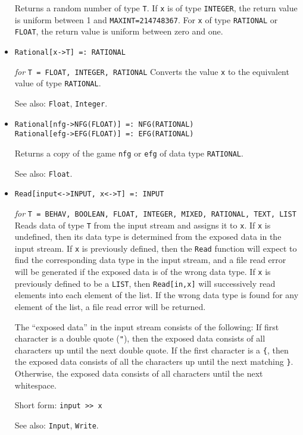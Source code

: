 \begin{itemize}
\bd
Returns a random number of type \verb+T+.  If \verb+x+ is of type
\verb+INTEGER+, the return value is uniform between 1 and
\verb+MAXINT=214748367+.  For \verb+x+ of type \verb+RATIONAL+ or
\verb+FLOAT+, the return value is uniform between zero and one.  
\ed

\item
\protect \large \begin{verbatim}
Rational[x->T] =: RATIONAL
\end{verbatim} \normalsize

{\it for} {\tt T = FLOAT, INTEGER, RATIONAL}
\bd
Converts the value \verb+x+ to the equivalent value of
type {\tt RATIONAL}.
\item [See also:] \verb+Float+, \verb+Integer+.
\ed

\item
\protect \large \begin{verbatim}
Rational[nfg->NFG(FLOAT)] =: NFG(RATIONAL)
Rational[efg->EFG(FLOAT)] =: EFG(RATIONAL)
\end{verbatim} \normalsize

\bd
Returns a copy of the game \verb+nfg+ or \verb+efg+ of data type 
{\tt RATIONAL}. 
\item [See also:] \verb+Float+.
\ed

\item
\protect \large \begin{verbatim}
Read[input<->INPUT, x<->T] =: INPUT 
\end{verbatim}\normalsize

{\it for} {\tt T = BEHAV, BOOLEAN, FLOAT, INTEGER, MIXED, RATIONAL,
TEXT, LIST}
\bd
Reads data of type \verb+T+ from the input stream and assigns it to
\verb+x+.  If \verb+x+ is undefined, then its data type is determined
from the exposed data in the input stream.  If \verb+x+ is previously
defined, then the \verb+Read+ function will expect to find the
corresponding data type in the input stream, and a file read error
will be generated if the exposed data is of the wrong data type.  If
\verb+x+ is previously defined to be a \verb+LIST+, then \verb+Read[in,x]+
will successively read elements into each element of the list.  If the
wrong data type is found for any element of the list, a file read
error will be returned.

The ``exposed data'' in the input stream consists of the following: If
first character is a double quote (\verb+"+), then the exposed data
consists of all characters up until the next double quote.  If the
first character is a \verb+{+, then the exposed data consists of all
the characters up until the next matching \verb+}+.  Otherwise, the
exposed data consists of all characters until the next whitespace.
\item [Short form:] \verb+input >> x+
\item [See also:] \verb+Input+, \verb+Write+.
\ed


\end{itemize}
